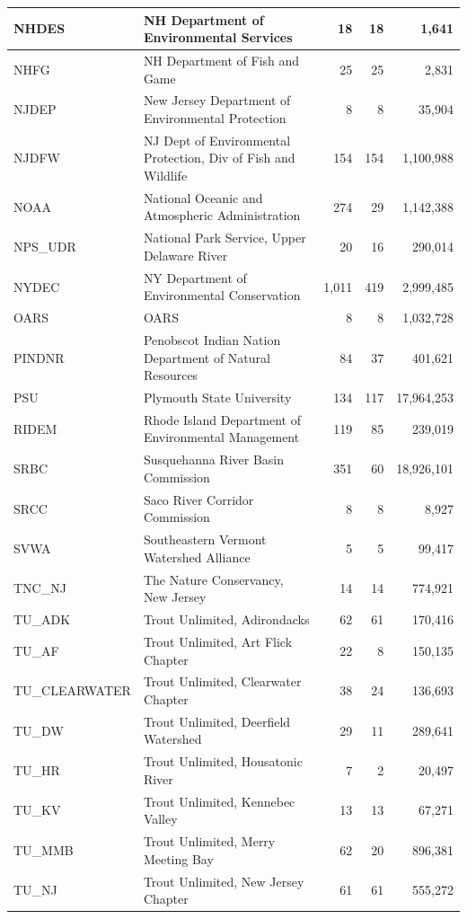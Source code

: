\documentclass[]{book}
\begin{document}
\begin{tabular}{l|l|r|r|r}
\hline
NHDES & NH Department of Environmental Services & 18 & 18 & 1,641\\
\hline
NHFG & NH Department of Fish and Game & 25 & 25 & 2,831\\
\hline
NJDEP & New Jersey Department of Environmental Protection & 8 & 8 & 35,904\\
\hline
NJDFW & NJ Dept of Environmental Protection, Div of Fish and Wildlife & 154 & 154 & 1,100,988\\
\hline
NOAA & National Oceanic and Atmospheric Administration & 274 & 29 & 1,142,388\\
\hline
NPS\_UDR & National Park Service, Upper Delaware River & 20 & 16 & 290,014\\
\hline
NYDEC & NY Department of Environmental Conservation & 1,011 & 419 & 2,999,485\\
\hline
OARS & OARS & 8 & 8 & 1,032,728\\
\hline
PINDNR & Penobscot Indian Nation Department of Natural Resources & 84 & 37 & 401,621\\
\hline
PSU & Plymouth State University & 134 & 117 & 17,964,253\\
\hline
RIDEM & Rhode Island Department of Environmental Management & 119 & 85 & 239,019\\
\hline
SRBC & Susquehanna River Basin Commission & 351 & 60 & 18,926,101\\
\hline
SRCC & Saco River Corridor Commission & 8 & 8 & 8,927\\
\hline
SVWA & Southeastern Vermont Watershed Alliance & 5 & 5 & 99,417\\
\hline
TNC\_NJ & The Nature Conservancy, New Jersey & 14 & 14 & 774,921\\
\hline
TU\_ADK & Trout Unlimited, Adirondacks & 62 & 61 & 170,416\\
\hline
TU\_AF & Trout Unlimited, Art Flick Chapter & 22 & 8 & 150,135\\
\hline
TU\_CLEARWATER & Trout Unlimited, Clearwater Chapter & 38 & 24 & 136,693\\
\hline
TU\_DW & Trout Unlimited, Deerfield Watershed & 29 & 11 & 289,641\\
\hline
TU\_HR & Trout Unlimited, Housatonic River & 7 & 2 & 20,497\\
\hline
TU\_KV & Trout Unlimited, Kennebec Valley & 13 & 13 & 67,271\\
\hline
TU\_MMB & Trout Unlimited, Merry Meeting Bay & 62 & 20 & 896,381\\
\hline
TU\_NJ & Trout Unlimited, New Jersey Chapter & 61 & 61 & 555,272\\

\end{tabular}
\end{document}
